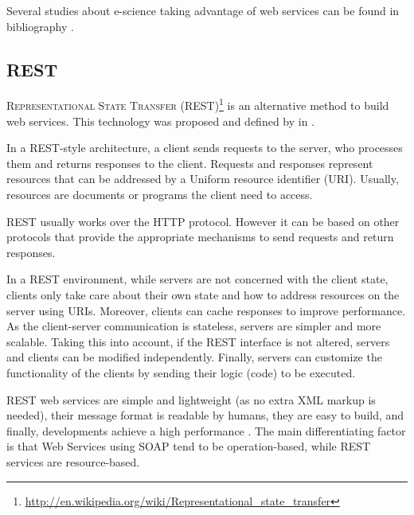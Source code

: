 Several studies about e-science taking advantage of web services can be found in bibliography \cite{Oinn04Taverna,davidson08workflows,Ludascher06Kepler,Perera06workflows}.

\subsection{REST}
\textsc{Representational State Transfer} (REST)\footnote{\url{http://en.wikipedia.org/wiki/Representational_state_transfer}} is an alternative method to build web services.
This technology was proposed and defined by  in \cite{Fielding2002}.

In a REST-style architecture, a client sends requests to the server, who processes them and returns responses to the client.
Requests and responses represent resources that can be addressed by a Uniform resource identifier (URI). Usually, resources are documents or programs the client need to access.

REST usually works over the HTTP protocol. However it can be based on other protocols that provide the appropriate mechanisms to send requests and return responses.

In a REST environment, while servers are not concerned with the client state, clients only take care about their own state and how to address resources on the server using URIs. Moreover, clients can cache responses to improve performance.
As the client-server communication is stateless, servers are simpler and more scalable. 
Taking this into account, if the REST interface is not altered, servers and clients can be modified independently.
Finally, servers can customize the functionality of the clients by sending their logic (code) to be executed.


REST web services are simple and lightweight (as no extra XML markup is needed), their message format is readable by humans, they are easy to build, and finally, developments achieve a high performance \cite{Daigneau2011}. The main differentiating factor is that Web Services using SOAP tend to be operation-based, while REST services are resource-based.

